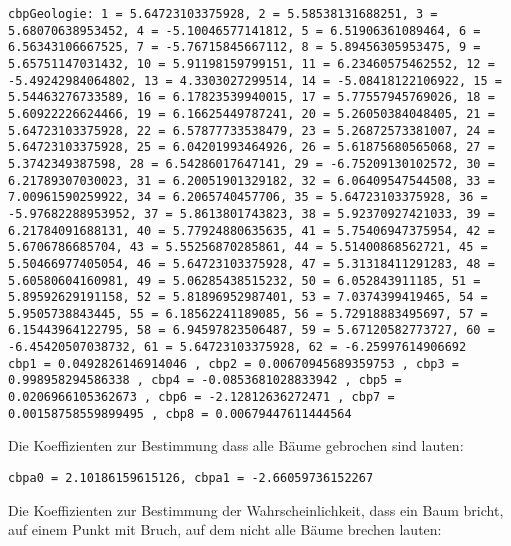 \documentclass[twocolumn]{scrartcl}
\begin{document}
\texttt{cbpGeologie: 1 = 5.64723103375928, 2 = 5.58538131688251, 3 = 5.68070638953452, 4 = -5.10046577141812, 5 = 6.51906361089464, 6 = 6.56343106667525, 7 = -5.76715845667112, 8 = 5.89456305953475, 9 = 5.65751147031432, 10 = 5.91198159799151, 11 = 6.23460575462552, 12 = -5.49242984064802, 13 = 4.3303027299514, 14 = -5.08418122106922, 15 = 5.54463276733589, 16 = 6.17823539940015, 17 = 5.77557945769026, 18 = 5.60922226624466, 19 = 6.16625449787241, 20 = 5.26050384048405, 21 = 5.64723103375928, 22 = 6.57877733538479, 23 = 5.26872573381007, 24 = 5.64723103375928, 25 = 6.04201993464926, 26 = 5.61875680565068, 27 = 5.3742349387598, 28 = 6.54286017647141, 29 = -6.75209130102572, 30 = 6.21789307030023, 31 = 6.20051901329182, 32 = 6.06409547544508, 33 = 7.00961590259922, 34 = 6.2065740457706, 35 = 5.64723103375928, 36 = -5.97682288953952, 37 = 5.8613801743823, 38 = 5.92370927421033, 39 = 6.21784091688131, 40 = 5.77924880635635, 41 = 5.75406947375954, 42 = 5.6706786685704, 43 = 5.55256870285861, 44 = 5.51400868562721, 45 = 5.50466977405054, 46 = 5.64723103375928, 47 = 5.31318411291283, 48 = 5.60580604160981, 49 = 5.06285438515232, 50 = 6.052843911185, 51 = 5.89592629191158, 52 = 5.81896952987401, 53 = 7.0374399419465, 54 = 5.9505738843445, 55 = 6.18562241189085, 56 = 5.72918883495697, 57 = 6.15443964122795, 58 = 6.94597823506487, 59 = 5.67120582773727, 60 = -6.45420507038732, 61 = 5.64723103375928, 62 = -6.25997614906692\\
  cbp1 = 0.0492826146914046
  , cbp2 = 0.00670945689359753
  , cbp3 = 0.998958294586338
  , cbp4 = -0.0853681028833942
  , cbp5 = 0.0206966105362673
  , cbp6 = -2.12812636272471
  , cbp7 = 0.00158758559899495
  , cbp8 = 0.00679447611444564
}

Die Koeffizienten zur Bestimmung dass alle Bäume gebrochen sind lauten:

\texttt{cbpa0 = 2.10186159615126, cbpa1 = -2.66059736152267}

Die Koeffizienten zur Bestimmung der Wahrscheinlichkeit, dass ein Baum bricht, auf einem Punkt mit Bruch, auf dem nicht alle Bäume brechen lauten:
\end{document}
